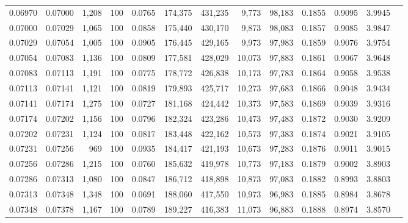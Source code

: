 \begin{tabular}{rrrrrrrrrrrrr}
0.06970 & 0.07000 & 1,208 & 100 &                                     0.0765 & 174,375 & 431,235 &   9,773 &  98,183 & 0.1855 & 0.9095 & 3.9945 \\
0.07000 & 0.07029 & 1,065 & 100 &                                     0.0858 & 175,440 & 430,170 &   9,873 &  98,083 & 0.1857 & 0.9085 & 3.9847 \\
0.07029 & 0.07054 & 1,005 & 100 &                                     0.0905 & 176,445 & 429,165 &   9,973 &  97,983 & 0.1859 & 0.9076 & 3.9754 \\
0.07054 & 0.07083 & 1,136 & 100 &                                     0.0809 & 177,581 & 428,029 &  10,073 &  97,883 & 0.1861 & 0.9067 & 3.9648 \\
0.07083 & 0.07113 & 1,191 & 100 &                                     0.0775 & 178,772 & 426,838 &  10,173 &  97,783 & 0.1864 & 0.9058 & 3.9538 \\
0.07113 & 0.07141 & 1,121 & 100 &                                     0.0819 & 179,893 & 425,717 &  10,273 &  97,683 & 0.1866 & 0.9048 & 3.9434 \\
0.07141 & 0.07174 & 1,275 & 100 &                                     0.0727 & 181,168 & 424,442 &  10,373 &  97,583 & 0.1869 & 0.9039 & 3.9316 \\
0.07174 & 0.07202 & 1,156 & 100 &                                     0.0796 & 182,324 & 423,286 &  10,473 &  97,483 & 0.1872 & 0.9030 & 3.9209 \\
0.07202 & 0.07231 & 1,124 & 100 &                                     0.0817 & 183,448 & 422,162 &  10,573 &  97,383 & 0.1874 & 0.9021 & 3.9105 \\
0.07231 & 0.07256 &   969 & 100 &                                     0.0935 & 184,417 & 421,193 &  10,673 &  97,283 & 0.1876 & 0.9011 & 3.9015 \\
0.07256 & 0.07286 & 1,215 & 100 &                                     0.0760 & 185,632 & 419,978 &  10,773 &  97,183 & 0.1879 & 0.9002 & 3.8903 \\
0.07286 & 0.07313 & 1,080 & 100 &                                     0.0847 & 186,712 & 418,898 &  10,873 &  97,083 & 0.1882 & 0.8993 & 3.8803 \\
0.07313 & 0.07348 & 1,348 & 100 &                                     0.0691 & 188,060 & 417,550 &  10,973 &  96,983 & 0.1885 & 0.8984 & 3.8678 \\
0.07348 & 0.07378 & 1,167 & 100 &                                     0.0789 & 189,227 & 416,383 &  11,073 &  96,883 & 0.1888 & 0.8974 & 3.8570 \\

\end{tabular}
